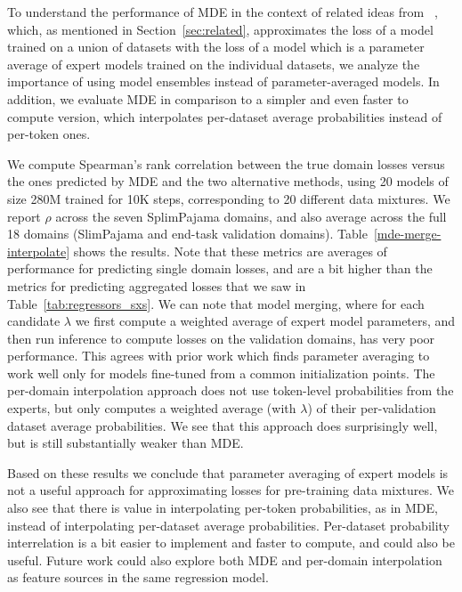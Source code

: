  \label{sec:model_merge}
 

 To understand the performance of MDE in the context of related ideas from ~\citet{emnlp-merge}, which, as mentioned in Section~\ref{sec:related}, approximates the loss of a model trained on a union of datasets with the loss of a model which is a parameter average of expert models trained on the individual datasets, we analyze the importance of using model ensembles instead of parameter-averaged models. In addition, we evaluate MDE in comparison to a simpler and even faster to compute version, which interpolates per-dataset average probabilities instead of per-token ones.


We compute Spearman's rank correlation between the true domain losses
versus the ones predicted by MDE and the two alternative methods, using 20 models of size 280M trained for 10K steps, corresponding to 20 different data mixtures. We report $\rho$ across the seven SplimPajama domains, and also average across the full 18 domains (SlimPajama and end-task validation domains).  Table~\ref{mde-merge-interpolate} shows the results. Note that these metrics are averages of performance for predicting single domain losses, and are a bit higher than the metrics for predicting aggregated losses that we saw in Table~\ref{tab:regressors_sxs}. We can note that model merging, where for each candidate $\lambda$ we first compute a weighted average of expert model parameters, and then run inference to compute losses on the validation domains, has very poor performance. This agrees with prior work which finds parameter averaging to work well only for models fine-tuned from a common initialization points.  The per-domain interpolation approach does not use token-level probabilities from the experts, but only computes a weighted average (with $\lambda$) of their per-validation dataset average probabilities. We see that this approach does surprisingly well, but is still substantially weaker than MDE. 

Based on these results we conclude that parameter averaging of expert models  is not a useful approach for approximating losses for pre-training data mixtures. We also see that there is value in interpolating per-token probabilities, as in MDE, instead of interpolating per-dataset average probabilities. Per-dataset probability interrelation is a bit easier to implement and faster to compute, and could also be useful. Future work could also explore both MDE and per-domain interpolation as feature sources in the same regression model.



